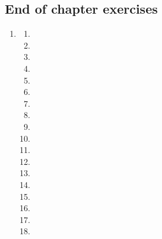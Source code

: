 \subsection{End of chapter exercises} %
\begin{enumerate}[label=\textbf{\arabic*}., itemsep=5pt]
\item %
\begin{multicols}{2}
\begin{enumerate}[label=\textbf{(\alph*)}, itemsep=7pt]
\item %
\item %
\item %
\item %
\item %
\item %
\item %
\item %
\item %
\item %
\item %
\item %
\item %
\item %
\item %
\item %
\item %
\item %
\end{enumerate}
\end{multicols}



\end{enumerate}
